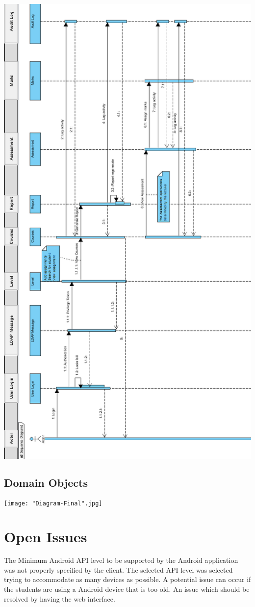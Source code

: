 \documentclass[10pt,a4paper]{article}
\begin{document}
\includegraphics[scale=0.75]{Sequence.png}

\subsection{Domain Objects}


\texttt{[image: "Diagram-Final".jpg]}

\section{Open Issues}
The Minimum Android API level to be supported by the Android application was not properly specified by the client. The selected API level was selected trying to accommodate as many devices as possible. A potential issue can occur if the students are using a Android device that is too old. An issue which should be resolved by having the web interface.
\end{document}

